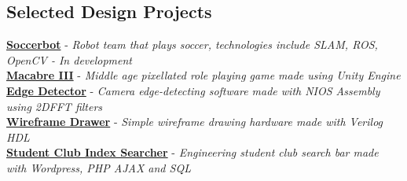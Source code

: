 \documentclass[10pt, a4paper]{cv}
\begin{document}
\subsection*{Selected Design Projects}
\noindent
{}\textbf{\href{http://github.com/utra-robosoccer/soccerbot}{Soccerbot}} - \emph{Robot team that plays soccer, technologies include SLAM, ROS, OpenCV - In development}\\
\textbf{\href{http://vuwij.com/index.php/macabre}{Macabre III}} - \emph{Middle age pixellated role playing game made using Unity Engine}\\
\textbf{\href{https://github.com/lpahlavi/EdgeDetector}{Edge Detector}} - \emph{Camera edge-detecting software made with NIOS Assembly using 2DFFT filters}\\
\textbf{\href{http://vuwij.com/index.php/projects1/80-programming-projects/93-3d-hardware-wireframe-renderer}{Wireframe Drawer}} - \emph{Simple wireframe drawing hardware made with Verilog HDL}\\
\textbf{\href{http://skule.ca/view-clubs/}{Student Club Index Searcher}} - \emph{Engineering student club search bar made with Wordpress, PHP AJAX and SQL}\\
\end{document}
